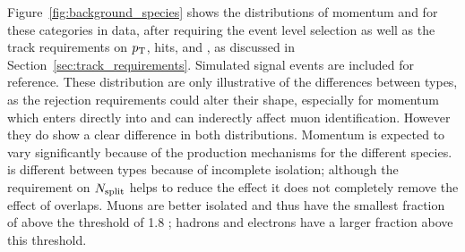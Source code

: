 Figure~\ref{fig:background_species} shows the distributions of momentum and \dedx for these categories in data, after requiring the event level selection as well as the track requirements on $p_{\mathrm{T}}$, hits, and \Nsplit, as discussed in Section~\ref{sec:track_requirements}.
Simulated signal events are included for reference.
These distribution are only illustrative of the differences between types, as the rejection requirements could alter their shape, especially for momentum which enters directly into \ep and can inderectly affect muon identification.
However they do show a clear difference in both distributions.
Momentum is expected to vary significantly because of the production mechanisms for the different species.
\dedx is different between types because of incomplete isolation; although the requirement on $N_{\mathrm{split}}$ helps to reduce the effect it does not completely remove the effect of overlaps.
Muons are better isolated and thus have the smallest fraction of \dedx above the threshold of 1.8 \MeVgcm; hadrons and electrons have a larger fraction above this threshold.


